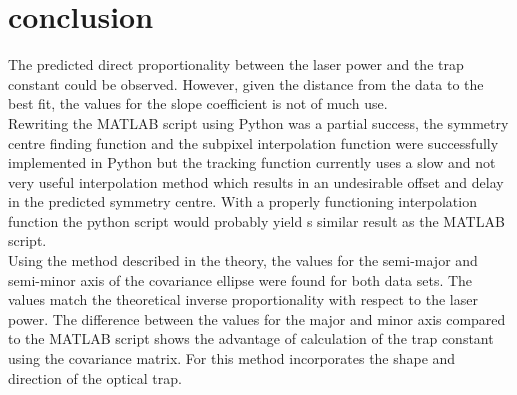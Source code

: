 \section{conclusion}
The predicted direct proportionality between the laser power and the trap constant could be observed. However, given the distance from the data to the best fit, the values for the slope coefficient is not of much use.\\
Rewriting the MATLAB script using Python was a partial success, the symmetry centre finding function and the subpixel interpolation function were successfully implemented in Python but the tracking function currently uses a slow and not very useful interpolation method which results in an undesirable offset and delay in the predicted symmetry centre. With a properly functioning interpolation function the python script would probably yield s similar result as the MATLAB script.\\
Using the method described in the theory, the values for the semi-major and semi-minor axis of the covariance ellipse were found for both data sets. The values match the theoretical inverse proportionality with respect to the laser power. The difference between the values for the major and minor axis compared to the MATLAB script shows the advantage of calculation of the trap constant using the covariance matrix. For this method incorporates the shape and direction of the optical trap.\\

\begin{comment}

\vspace{-0.5cm}
\begin{table}[h!]
    \centering
    \begin{tabular}{|l|l|l|l|}
        \hline
        coefficient for & $a_x$ {[}$pN/(nm\cdot mW)${]} & $a_y$ {[}$pN/(nm \cdot mW)${]} & $a_{tot}$ {[}$pN/(nm \cdot mW)${]} \\ \hline
        dataset 1       & $1.382\cdot 10^{-6}$          & $1.280 \cdot 10^{-6}$          & $1.740 \cdot 10^{-4}$              \\ \hline
        dataset 2       & $1.478 \cdot 10^{-5}$         & $3.974 \cdot 10^{-6}$          & $1.551 \cdot 10^{-5}$              \\ \hline
    \end{tabular}
    \caption{The results of the linear fits for the trap stiffness as a function of laser output power. The shown $a$-factors satisfy the least squares fit of the function: $k_i = a_i \cdot P$ }
\end{table}

\end{comment}